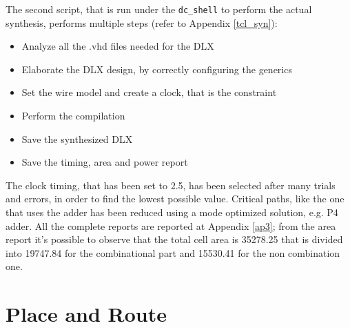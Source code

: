 The second script, that is run under the \texttt{dc\_shell} to perform the actual synthesis, performs multiple steps (refer to Appendix \ref{tcl_syn}):
\begin{itemize}
	\itemsep0sp
	\item Analyze all the .vhd files needed for the DLX
	\item Elaborate the DLX design, by correctly configuring the generics
	\item Set the wire model and create a clock, that is the constraint
	\item Perform the compilation
	\item Save the synthesized DLX
	\item Save the timing, area and power report 
\end{itemize}
The clock timing, that has been set to 2.5, has been selected after many trials and errors, in order to find the lowest possible value. Critical paths, like the one that uses the adder has been reduced using a mode optimized solution, e.g. P4 adder.\newline\newline
All the complete reports are reported at Appendix \ref{ap3}; from the area report it's possible to observe that the total cell area is 35278.25 that is divided into 19747.84 for the combinational part and 15530.41 for the non combination one.



\section{Place and Route}